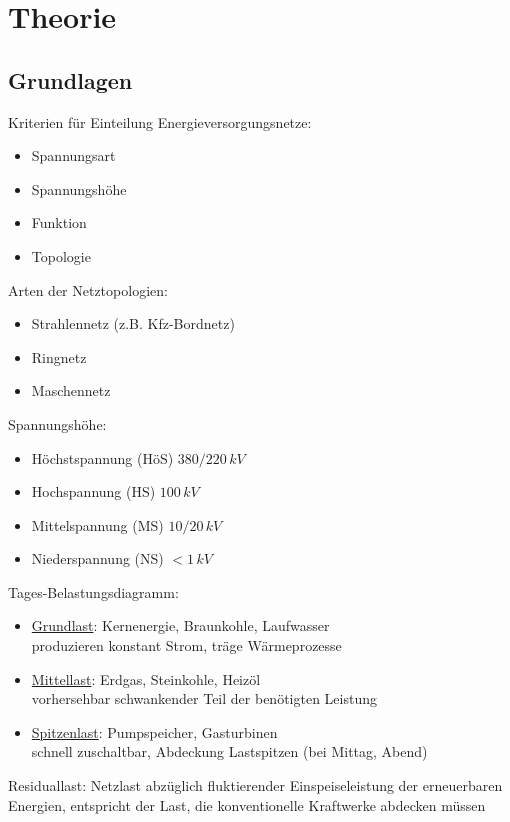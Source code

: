 \newpage
\section{Theorie}
\subsection{Grundlagen}
Kriterien für Einteilung Energieversorgungsnetze:
\begin{itemize}
    \item Spannungsart \item Spannungshöhe \item Funktion \item Topologie
\end{itemize}

Arten der Netztopologien:
\begin{itemize}
\item Strahlennetz (z.B. Kfz-Bordnetz)
\item Ringnetz
\item Maschennetz
\end{itemize}

Spannungshöhe:
\begin{itemize}
    \item Höchstspannung (HöS) $380/220 \, kV$
    \item Hochspannung (HS) $100 \, kV$
    \item Mittelspannung (MS) $10/20 \, kV$
    \item Niederspannung (NS) $<1 \, kV$
\end{itemize}

Tages-Belastungsdiagramm:
\begin{itemize}
    \item \ul{Grundlast}: Kernenergie, Braunkohle, Laufwasser\\
        produzieren konstant Strom, träge Wärmeprozesse
        \item \ul{Mittellast}: Erdgas, Steinkohle, Heizöl\\
            vorhersehbar schwankender Teil der benötigten Leistung
            \item \ul{Spitzenlast}: Pumpspeicher, Gasturbinen\\
                schnell zuschaltbar, Abdeckung Lastspitzen (bei Mittag, Abend)
\end{itemize}
Residuallast: Netzlast abzüglich fluktierender Einspeiseleistung der erneuerbaren Energien,
entspricht der Last, die konventionelle Kraftwerke abdecken müssen

